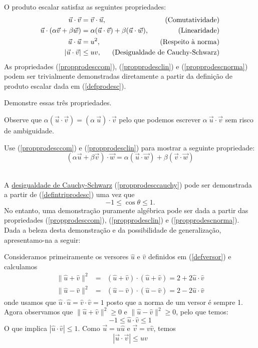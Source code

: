 O produto escalar satisfaz as seguintes propriedades:
\begin{subequations}\label{proprodesc}
\begin{align}
\vec{u}\cdot\vec{v}&=\vec{v}\cdot\vec{u},&\text{(Comutatividade)}\label{propprodesccom}\\
\vec{u}\cdot\left(\alpha\vec{v}+\beta \vec{w}\right)&=\alpha(\vec{u}\cdot\vec{v})+\beta(\vec{u}\cdot\vec{w}),\hspace{-5cm}&\text{(Linearidade)}\label{propprodesclin}\\
\vec{u}\cdot\vec{u}&=u^2,&\text{(Respeito à norma)}\label{propprodescnorma}\\
\left|\vec{u}\cdot\vec{v}\right|&\leq uv,&\text{(Desigualdade de Cauchy-Schwarz)}\label{propprodesccauchy}
\end{align}
\end{subequations}
As propriedades (\ref{propprodesccom}), (\ref{propprodesclin}) e (\ref{propprodescnorma}) podem ser trivialmente demonstradas diretamente a partir da definição de produto escalar dada em (\ref{defprodesc}).
\begin{exer} Demonstre essas três propriedades.
\end{exer}
Observe que $\alpha(\vec{u}\cdot\vec{v})=(\alpha~\!\vec{u})\cdot\vec{v}$ pelo que podemos escrever $\alpha~\!\vec{u}\cdot\vec{v}$ sem risco de ambiguidade.
\begin{exer} Use (\ref{propprodesccom}) e  (\ref{propprodesclin}) para mostrar a seguinte propriedade:
$$
\left(\alpha\vec{u}+\beta \vec{v}\right)\cdot \vec{w}=\alpha (\vec{u}\cdot\vec{w})+ \beta (\vec{v}\cdot\vec{w})
$$

\end{exer}
~~ \\

A \underline{desigualdade de Cauchy-Schwarz} (\ref{propprodesccauchy}) pode ser demonstrada a partir de (\ref{defintriprodesc}) uma vez que $$-1\leq \cos\theta \leq 1.$$
No entanto, uma demonstração puramente algébrica pode ser dada a partir das propriedades (\ref{propprodesccom}), (\ref{propprodesclin}) e (\ref{propprodescnorma}). Dada a beleza desta demonstração e da possibilidade de generalização, apresentamo-na a seguir:

Consideramos primeiramente os versores $\hat{u}$ e $\hat{v}$ definidos em (\ref{defversor}) e calculamos
\begin{eqnarray*}
\|\hat{u}+\hat{v}\|^2 &=& \left(\hat{u}+\hat{v}\right)\cdot \left(\hat{u}+\hat{v}\right) = 2+2\hat{u}\cdot\hat{v} \\
\|\hat{u}-\hat{v}\|^2 &=& \left(\hat{u}-\hat{v}\right)\cdot \left(\hat{u}-\hat{v}\right) = 2-2\hat{u}\cdot\hat{v}
\end{eqnarray*}
onde usamos que $\hat{u}\cdot\hat{u}=\hat{v}\cdot\hat{v}=1$ posto que a norma de um versor é sempre 1. Agora observamos que $\|\hat{u}+\hat{v}\|^2\geq 0 $ e $\|\hat{u}-\hat{v}\|^2\geq 0 $, pelo que temos:
$$-1\leq \hat{u}\cdot\hat{v} \leq 1$$
O que implica $|\hat{u}\cdot\hat{v}|\leq 1$. Como $\vec{u}=u\hat{u} $ e $\vec{v}=v\hat{v}$, temos
$$|\vec{u}\cdot\vec{v}|\leq uv$$

